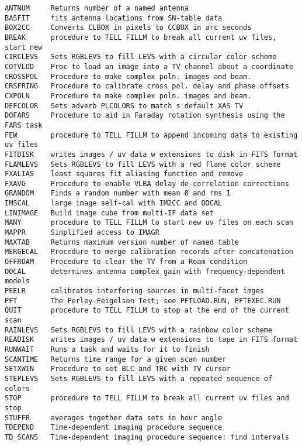 
\vskip 0.5pt
\bbve\begin{verbatim}
ANTNUM     Returns number of a named antenna
BASFIT     fits antenna locations from SN-table data
BOX2CC     Converts CLBOX in pixels to CCBOX in arc seconds
BREAK      procedure to TELL FILLM to break all current uv files, start new
CIRCLEVS   Sets RGBLEVS to fill LEVS with a circular color scheme
COTVLOD    Proc to load an image into a TV channel about a coordinate
CROSSPOL   Procedure to make complex poln. images and beam.
CRSFRING   Procedure to calibrate cross pol. delay and phase offsets
CXPOLN     Procedure to make complex poln. images and beam.
DEFCOLOR   Sets adverb PLCOLORS to match s default XAS TV
DOFARS     Procedure to aid in Faraday rotation synthesis using the FARS task
FEW        procedure to TELL FILLM to append incoming data to existing uv files
FITDISK    writes images / uv data w extensions to disk in FITS format
FLAMLEVS   Sets RGBLEVS to fill LEVS with a red flame color scheme
FXALIAS    least squares fit aliasing function and remove
FXAVG      Procedure to enable VLBA delay de-correlation corrections
GRANDOM    Finds a random number with mean 0 and rms 1
IMSCAL     large image self-cal with IM2CC and OOCAL
LINIMAGE   Build image cube from multi-IF data set
MANY       procedure to TELL FILLM to start new uv files on each scan
MAPPR      Simplified access to IMAGR
MAXTAB     Returns maximum version number of named table
MERGECAL   Procedure to merge calibration records after concatenation
OFFROAM    Procedure to clear the TV from a Roam condition
OOCAL      determines antenna complex gain with frequency-dependent models
PEELR      calibrates interfering sources in multi-facet imges
PFT        The Perley-Feigelson Test; see PFTLOAD.RUN, PFTEXEC.RUN
QUIT       procedure to TELL FILLM to stop at the end of the current scan
RAINLEVS   Sets RGBLEVS to fill LEVS with a rainbow color scheme
READISK    writes images / uv data w extensions to tape in FITS format
RUNWAIT    Runs a task and waits for it to finish
SCANTIME   Returns time range for a given scan number
SETXWIN    Procedure to set BLC and TRC with TV cursor
STEPLEVS   Sets RGBLEVS to fill LEVS with a repeated sequence of colors
STOP       procedure to TELL FILLM to break all current uv files and stop
STUFFR     averages together data sets in hour angle
TDEPEND    Time-dependent imaging procedure sequence
TD_SCANS   Time-dependent imaging procedure sequence: find intervals

\end{verbatim}
